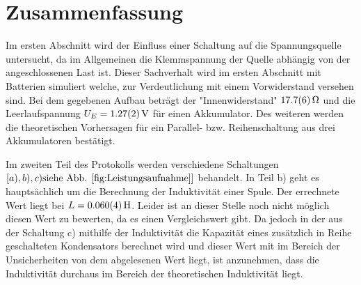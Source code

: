 
\section{Zusammenfassung}
Im ersten Abschnitt wird der Einfluss einer Schaltung auf die Spannungsquelle untersucht, da im Allgemeinen die Klemmspannung der Quelle abhängig von der angeschlossenen Last ist. Dieser Sachverhalt wird im ersten Abschnitt mit Batterien simuliert welche, zur Verdeutlichung mit einem Vorwiderstand versehen sind. Bei dem gegebenen Aufbau beträgt der "Innenwiderstand" $\SI{17.7+-0.6}{\ohm}$ und die Leerlaufspannung $U_E=\SI{1.27+-0.02}{V}$ für einen Akkumulator. Des weiteren werden die theoretischen Vorhersagen für ein Parallel- bzw. Reihenschaltung aus drei Akkumulatoren bestätigt.

Im zweiten Teil des Protokolls werden verschiedene Schaltungen  $\left[ a),b),c) \text{siehe Abb. \ref{fig:Leistungsaufnahme}} \right]$ behandelt.
In Teil b) geht es hauptsächlich um die Berechnung der Induktivität einer Spule.
Der errechnete Wert liegt bei $L= \SI{0,060+-0,004}{H}$. Leider ist an dieser Stelle noch nicht möglich diesen Wert zu bewerten, da es einen Vergleichswert gibt.
Da jedoch in der aus der Schaltung c) mithilfe der Induktivität die Kapazität eines zusätzlich in Reihe geschalteten Kondensators berechnet wird und dieser Wert mit im Bereich der Unsicherheiten von dem abgelesenen Wert liegt, ist anzunehmen, dass die Induktivität durchaus im Bereich der theoretischen Induktivität liegt.


